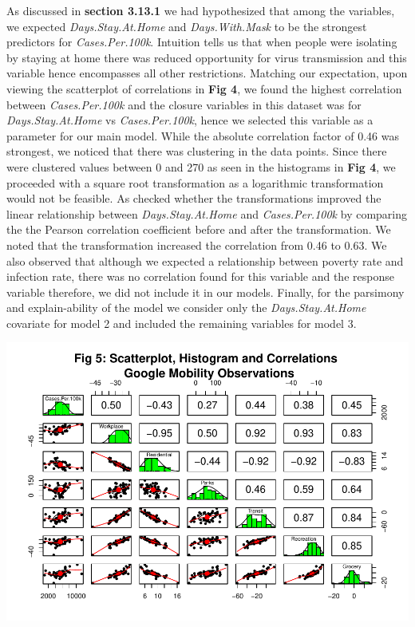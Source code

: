 \documentclass[
]{article}
\begin{document}
As discussed in \textbf{section 3.13.1} we had hypothesized that among
the variables, we expected \emph{Days.Stay.At.Home} and
\emph{Days.With.Mask} to be the strongest predictors for
\emph{Cases.Per.100k}. Intuition tells us that when people were
isolating by staying at home there was reduced opportunity for virus
transmission and this variable hence encompasses all other restrictions.
Matching our expectation, upon viewing the scatterplot of correlations
in \textbf{Fig 4}, we found the highest correlation between
\emph{Cases.Per.100k} and the closure variables in this dataset was for
\emph{Days.Stay.At.Home} vs \emph{Cases.Per.100k}, hence we selected
this variable as a parameter for our main model. While the absolute
correlation factor of 0.46 was strongest, we noticed that there was
clustering in the data points. Since there were clustered values between
0 and 270 as seen in the histograms in \textbf{Fig 4}, we proceeded with
a square root transformation as a logarithmic transformation would not
be feasible. As checked whether the transformations improved the linear
relationship between \emph{Days.Stay.At.Home} and \emph{Cases.Per.100k}
by comparing the the Pearson correlation coefficient before and after
the transformation. We noted that the transformation increased the
correlation from 0.46 to 0.63. We also observed that although we
expected a relationship between poverty rate and infection rate, there
was no correlation found for this variable and the response variable
therefore, we did not include it in our models. Finally, for the
parsimony and explain-ability of the model we consider only the
\emph{Days.Stay.At.Home} covariate for model 2 and included the
remaining variables for model 3.

\includegraphics{Final_Report_files/figure-latex/psych-2-1.pdf}
\end{document}
